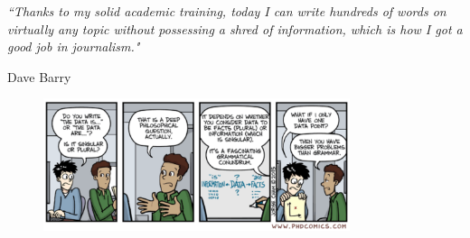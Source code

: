 \pagestyle{empty} %

\null\vfill %

\textit{``Thanks to my solid academic training, today I can write hundreds of words on virtually any topic without possessing a shred of information, which is how I got a good job in journalism."}

\begin{flushright}
Dave Barry
\end{flushright}

\begin{figure}[h!]
  \centering
    \includegraphics[width=0.8\textwidth]{figures/phd_comic.pdf}
\end{figure}

\vfill\vfill\vfill\vfill\vfill\vfill\null %

\cleardoublepage %
